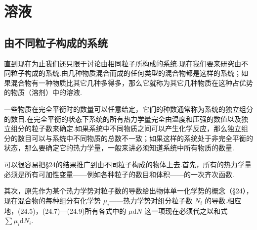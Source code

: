 \chapter{溶液}

\section{由不同粒子构成的系统}

直到现在为止我们还只限于讨论由相同粒子所构成的系统.现在我们要来研究由不同粒子构成的系统.由几种物质混合而成的任何类型的混合物都是这样的系统；如果混合物有一种物质比其它几种多得多，那么它就称为其它几种物质在这种占优势的物质（溶剂）中的溶液.

一些物质在完全平衡时的数量可以任意给定，它们的种数通常称为系统的独立组分的数目.在完全平衡的状态下系统的所有热力学量完全由温度和压强的数值以及独立组分的粒子数来确定.如果系统中不同物质之间可以产生化学反应，那么独立组分的数目可以与系统中不同物质的总数不一致；如果这样的系统处于非完全平衡的状态，那么要确定它的热力学量，一般来讲必须知道系统中所有物质的数量.

可以很容易把§24的结果推广到由不同粒子构成的物体上去.首先，所有的热力学量必须是所有可加性变量——例如各种粒子的数目和体积——的一次齐次函数.

其次，原先作为某个热力学势对粒子数的导数给出物体单一化学势的概念（§24），现在混合物的每种组分有化学势 $\mu_i$——热力学势对组分粒子数 $N_i$ 的导数.相应地，(24.5)，(24.7)—(24.9)所有各式中的 $\mu\mathrm{d}N$ 这一项现在必须代之以和式 $\sum\mu_i\mathrm{d}N_i$.

